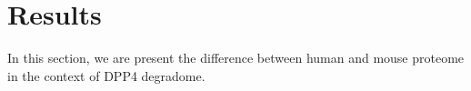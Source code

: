 \section{Results}
In this section, we are present the difference between human and mouse proteome in the context of DPP4 degradome. 